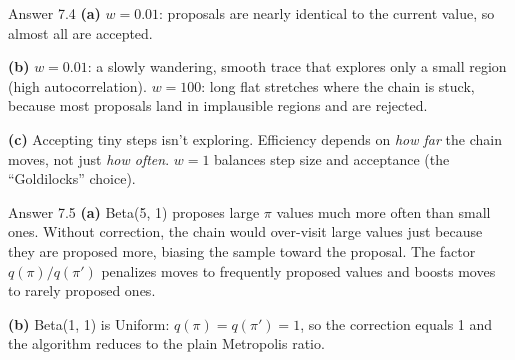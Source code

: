 \documentclass[aspectratio=43,11pt]{beamer}
\begin{document}
\begin{frame}{Answer 7.4}
  \textbf{(a)} $w = 0.01$: proposals are nearly identical to the current
  value, so almost all are accepted.
  \vspace{0.4em}

  \textbf{(b)} $w = 0.01$: a slowly wandering, smooth trace that explores
  only a small region (high autocorrelation). $w = 100$: long flat
  stretches where the chain is stuck, because most proposals land in
  implausible regions and are rejected.
  \vspace{0.4em}

  \textbf{(c)} Accepting tiny steps isn't exploring. Efficiency depends on
  \emph{how far} the chain moves, not just \emph{how often}. $w = 1$
  balances step size and acceptance (the ``Goldilocks'' choice).
\end{frame}

\begin{frame}{Answer 7.5}
  \textbf{(a)} Beta(5, 1) proposes large $\pi$ values much more often than
  small ones. Without correction, the chain would over-visit large values
  just because they are proposed more, biasing the sample toward the
  proposal. The factor $q(\pi)/q(\pi')$ penalizes moves to
  frequently proposed values and boosts moves to rarely proposed ones.
  \vspace{0.6em}

  \textbf{(b)} Beta(1, 1) is Uniform: $q(\pi) = q(\pi') = 1$, so the
  correction equals 1 and the algorithm reduces to the plain Metropolis
  ratio.
\end{frame}

%
\end{document}

